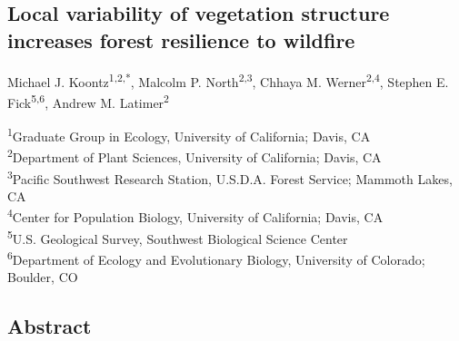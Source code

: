 \documentclass[twoside,12pt,final]{ucthesis-CA2012}
\begin{document}
\begin{ucmainmatter}

\chapter{Local variability of vegetation structure increases forest
resilience to
wildfire}\label{local-variability-of-vegetation-structure-increases-forest-resilience-to-wildfire}

 Michael J.
Koontz\textsuperscript{1,2,*}, Malcolm P. North\textsuperscript{2,3},
Chhaya M. Werner\textsuperscript{2,4}, Stephen E.
Fick\textsuperscript{5,6}, Andrew M. Latimer\textsuperscript{2}

\textsuperscript{1}Graduate Group in Ecology, University of California;
Davis, CA\\
\textsuperscript{2}Department of Plant Sciences, University of
California; Davis, CA\\
\textsuperscript{3}Pacific Southwest Research Station, U.S.D.A. Forest
Service; Mammoth Lakes, CA\\
\textsuperscript{4}Center for Population Biology, University of
California; Davis, CA\\
\textsuperscript{5}U.S. Geological Survey, Southwest Biological Science
Center\\
\textsuperscript{6}Department of Ecology and Evolutionary Biology,
University of Colorado; Boulder, CO

\section{Abstract}\label{abstract}


\end{ucmainmatter}
\end{document}
